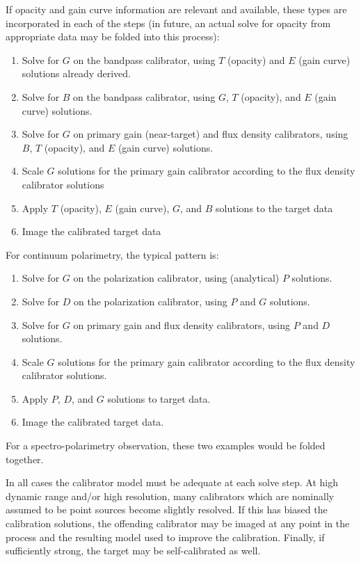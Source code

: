 If opacity and gain curve information are relevant and available,
these types are incorporated in each of the steps (in future, an
actual solve for opacity from appropriate data may be folded into this
process): 
 
\begin{enumerate}
   \item Solve for $G$ on the bandpass calibrator, using $T$ (opacity)
      and $E$ (gain curve) solutions already derived. 
   \item Solve for $B$ on the bandpass calibrator, using $G$, $T$
      (opacity), and $E$ (gain curve) solutions. 
   \item Solve for $G$ on primary gain (near-target) and flux density
      calibrators, using $B$, $T$ (opacity), and $E$ (gain curve)
      solutions. 
   \item Scale $G$ solutions for the primary gain calibrator according to
      the flux density calibrator solutions 
   \item Apply $T$ (opacity), $E$ (gain curve), $G$, and $B$ solutions
      to the target data 
   \item Image the calibrated target data 
\end{enumerate}

For continuum polarimetry, the typical pattern is:

\begin{enumerate}
   \item Solve for $G$ on the polarization calibrator, using (analytical)
      $P$ solutions. 
   \item Solve for $D$ on the polarization calibrator, using $P$ and $G$
      solutions. 
   \item Solve for $G$ on primary gain and flux density calibrators,
      using $P$ and $D$ solutions. 
   \item Scale $G$ solutions for the primary gain calibrator according to
      the flux density calibrator solutions. 
   \item Apply $P$, $D$, and $G$ solutions to target data.
   \item Image the calibrated target data. 
\end{enumerate}

For a spectro-polarimetry observation, these two examples would be
folded together. 

In all cases the calibrator model must be adequate at each solve
step. At high dynamic range and/or high resolution, many calibrators
which are nominally assumed to be point sources become slightly
resolved. If this has biased the calibration solutions, the offending
calibrator may be imaged at any point in the process and the resulting
model used to improve the calibration. Finally, if sufficiently
strong, the target may be self-calibrated as well. 

